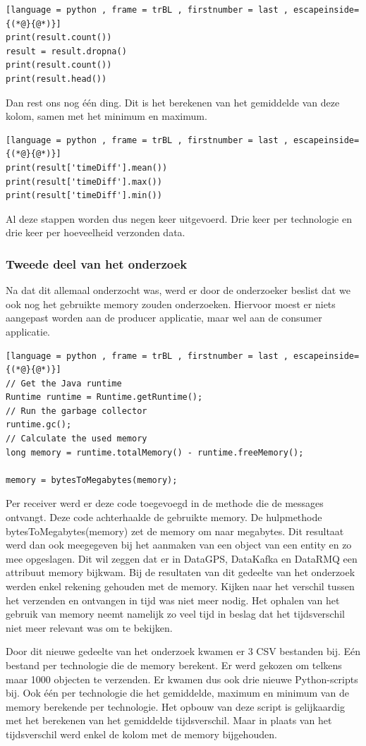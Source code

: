 \begin{lstlisting}[language = python , frame = trBL , firstnumber = last , escapeinside={(*@}{@*)}]
print(result.count())
result = result.dropna()
print(result.count())
print(result.head())
\end{lstlisting}

Dan rest ons nog één ding. Dit is het berekenen van het gemiddelde van deze kolom, samen met het minimum en maximum.
\begin{lstlisting}[language = python , frame = trBL , firstnumber = last , escapeinside={(*@}{@*)}]
print(result['timeDiff'].mean())
print(result['timeDiff'].max())
print(result['timeDiff'].min())
\end{lstlisting}
Al deze stappen worden dus negen keer uitgevoerd. Drie keer per technologie en drie keer per hoeveelheid verzonden data.

\subsubsection{Tweede deel van het onderzoek}
Na dat dit allemaal onderzocht was, werd er door de onderzoeker beslist dat we ook nog het gebruikte memory zouden onderzoeken. Hiervoor moest er niets aangepast worden aan de producer applicatie, maar wel aan de consumer applicatie. 

\begin{lstlisting}[language = python , frame = trBL , firstnumber = last , escapeinside={(*@}{@*)}]
// Get the Java runtime
Runtime runtime = Runtime.getRuntime();
// Run the garbage collector
runtime.gc();
// Calculate the used memory
long memory = runtime.totalMemory() - runtime.freeMemory();

memory = bytesToMegabytes(memory);
\end{lstlisting}
Per receiver werd er deze code toegevoegd in de methode die de messages ontvangt. Deze code achterhaalde de gebruikte memory. De hulpmethode bytesToMegabytes(memory) zet de memory om naar megabytes. Dit resultaat werd dan ook meegegeven bij het aanmaken van een object van een entity en zo mee opgeslagen. Dit wil zeggen dat er in DataGPS, DataKafka en DataRMQ een attribuut memory bijkwam. Bij de resultaten van dit gedeelte van het onderzoek werden enkel rekening gehouden met de memory. Kijken naar het verschil tussen het verzenden en ontvangen in tijd was niet meer nodig. Het ophalen van het gebruik van memory neemt namelijk zo veel tijd in beslag dat het tijdsverschil niet meer relevant was om te bekijken.

Door dit nieuwe gedeelte van het onderzoek kwamen er 3 CSV bestanden bij. Eén bestand per technologie die de memory berekent. Er werd gekozen om telkens maar 1000 objecten te verzenden. Er kwamen dus ook drie nieuwe Python-scripts bij. Ook één per technologie die het gemiddelde, maximum en minimum van de memory berekende per technologie. Het opbouw van deze script is gelijkaardig met het berekenen van het gemiddelde tijdsverschil. Maar in plaats van het tijdsverschil werd enkel de kolom met de memory bijgehouden.  